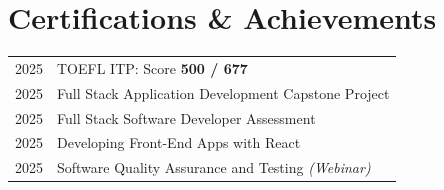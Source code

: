 \documentclass[9.5pt,a4paper]{article}
\begin{document}
\section{Certifications \& Achievements}

\begin{tabularx}{\linewidth}{@{} l X @{}}
  2025 & TOEFL ITP: Score \textbf{500 / 677} \\
  2025 & Full Stack Application Development Capstone Project \\
  2025 & Full Stack Software Developer Assessment \\
  2025 & Developing Front-End Apps with React \\
  2025 & Software Quality Assurance and Testing \textit{(Webinar)} \\
\end{tabularx}
\end{document}
